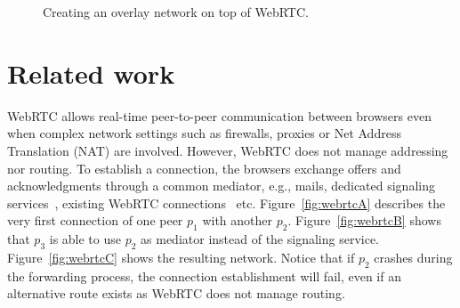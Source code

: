 
\begin{figure*}
\centering
{}
\hspace{5pt}
\hspace{5pt}
\caption{\label{fig:webrtc}Creating an overlay network on top of WebRTC.}
\end{figure*}


\section{Related work}
\label{sec:relatedwork}

WebRTC allows real-time peer-to-peer communication between browsers even when
complex network settings such as firewalls, proxies or Net Address Translation
(NAT) are involved. However, WebRTC does not manage addressing nor routing. To
establish a connection, the browsers exchange offers and acknowledgments through
a common mediator, e.g., mails, dedicated signaling services~\cite{peerjs},
existing WebRTC connections~\cite{p} etc. Figure~\ref{fig:webrtcA} describes the
very first connection of one peer $p_1$ with another
$p_2$. Figure~\ref{fig:webrtcB} shows that $p_3$ is able to use $p_2$ as
mediator instead of the signaling service. Figure~\ref{fig:webrtcC} shows the
resulting network. Notice that if $p_2$ crashes during the forwarding process,
the connection establishment will fail, even if an alternative route exists as
WebRTC does not manage routing.

